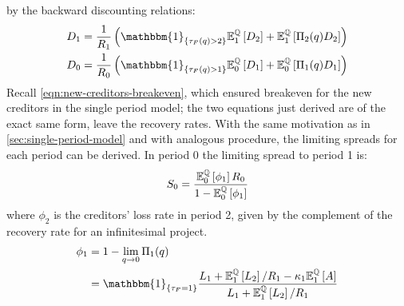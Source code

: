 \documentclass[main.tex]{subfiles}
\begin{document}
        by the backward discounting relations:
        \begin{align}
            D_{1} 
            &= 
            \frac{1}{R_{1}} 
            \left(
                \mathbbm{1}_{\{\tau_{F}(q) > 2\}} 
                \mathbb{E}_{1}^{\rnmeasure}\left[D_{2}\right] 
                +
                \mathbb{E}_{1}^{\rnmeasure}\left[\Pi_{2}(q)D_{2}\right] 
            \right) \\
            D_{0} 
            &= 
            \frac{1}{R_{0}} 
            \left(
                \mathbbm{1}_{\{\tau_{F}(q) > 1\}} 
                \mathbb{E}_{0}^{\rnmeasure}\left[D_{1}\right] 
                +
                \mathbb{E}_{0}^{\rnmeasure}\left[\Pi_{1}(q)D_{1}\right] 
            \right)
        \label{eqn:new-creditors-breakeven-two-period-model}
        \end{align}
        Recall \cref{eqn:new-creditors-breakeven}, 
        which ensured breakeven for the new creditors in the single period model;
        the two equations just derived are of the exact same form, leave the recovery rates. 
        With the same motivation as in \cref{sec:single-period-model} and with analogous procedure,
        the limiting spreads for each period can be derived.
        In period 0 the limiting spread to period 1 is:
        \begin{equation}
            S_0 =
            \frac{
                \mathbb{E}_{0}^{\mathbb{Q}}\left[\phi_1\right]R_0
            }{
                1 - \mathbb{E}_{0}^{\mathbb{Q}}\left[\phi_1\right] 
            }
        \end{equation}
        where $\phi_{2}$ is the creditors' loss rate in period 2,
        given by the complement of the recovery rate for an infinitesimal project.
        \begin{align}
            \phi_1 
            &=
            1 - \lim_{q\rightarrow0} \Pi_{1}(q) 
            \nonumber \\
            &=
            \mathbbm{1}_{\{\tau_{F}=1\}}
            \frac{
                L_{1}
                +
                \mathbb{E}_{1}^{\rnmeasure}\left[L_{2}\right]/R_1 
                - 
                \kappa_{1}\mathbb{E}_{1}^{\rnmeasure}\left[A\right]
            }{
                L_{1} + \mathbb{E}_{1}^{\rnmeasure}\left[L_{2}\right]/R_1
            }
        \end{align}
        
\end{document}
